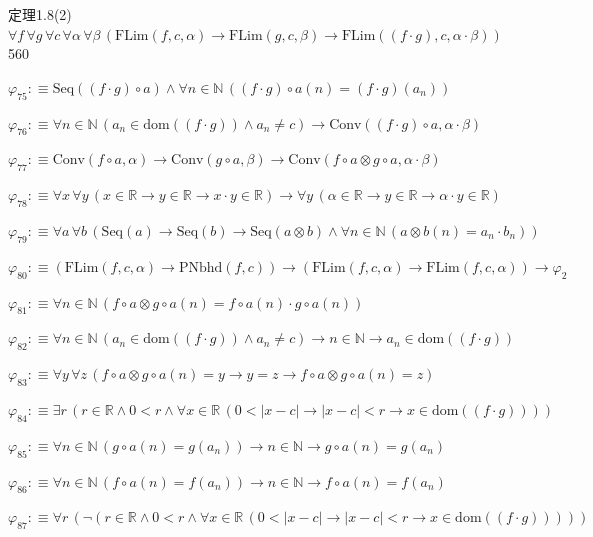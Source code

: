 \begin{fullproof}{定理1.8(2)}{$\forall f\,\forall g\,\forall c\,\forall \alpha\,\forall \beta\,(\mathrm{FLim}(f,c,\alpha) \to \mathrm{FLim}(g,c,\beta) \to \mathrm{FLim}((f \cdot g),c,\alpha \cdot \beta))$}{560}
\begin{abbrevlist}
\item $\varphi_{75} :\equiv \mathrm{Seq}((f \cdot g) \circ a) \land \forall n \in \mathbb{N}\,((f \cdot g) \circ a(n) = (f \cdot g)(a_{n}))$
\item $\varphi_{76} :\equiv \forall n \in \mathbb{N}\,(a_{n} \in \mathrm{dom}((f \cdot g)) \land a_{n} \neq c) \to \mathrm{Conv}((f \cdot g) \circ a,\alpha \cdot \beta)$
\item $\varphi_{77} :\equiv \mathrm{Conv}(f \circ a,\alpha) \to \mathrm{Conv}(g \circ a,\beta) \to \mathrm{Conv}(f \circ a \otimes g \circ a,\alpha \cdot \beta)$
\item $\varphi_{78} :\equiv \forall x\,\forall y\,(x \in \mathbb{R} \to y \in \mathbb{R} \to x \cdot y \in \mathbb{R}) \to \forall y\,(\alpha \in \mathbb{R} \to y \in \mathbb{R} \to \alpha \cdot y \in \mathbb{R})$
\item $\varphi_{79} :\equiv \forall a\,\forall b\,(\mathrm{Seq}(a) \to \mathrm{Seq}(b) \to \mathrm{Seq}(a \otimes b) \land \forall n \in \mathbb{N}\,(a \otimes b(n) = a_{n} \cdot b_{n}))$
\item $\varphi_{80} :\equiv (\mathrm{FLim}(f,c,\alpha) \to \mathrm{PNbhd}(f,c)) \to (\mathrm{FLim}(f,c,\alpha) \to \mathrm{FLim}(f,c,\alpha)) \to \varphi_{2}$
\item $\varphi_{81} :\equiv \forall n \in \mathbb{N}\,(f \circ a \otimes g \circ a(n) = f \circ a(n) \cdot g \circ a(n))$
\item $\varphi_{82} :\equiv \forall n \in \mathbb{N}\,(a_{n} \in \mathrm{dom}((f \cdot g)) \land a_{n} \neq c) \to n \in \mathbb{N} \to a_{n} \in \mathrm{dom}((f \cdot g))$
\item $\varphi_{83} :\equiv \forall y\,\forall z\,(f \circ a \otimes g \circ a(n) = y \to y = z \to f \circ a \otimes g \circ a(n) = z)$
\item $\varphi_{84} :\equiv \exists r\,(r \in \mathbb{R} \land 0 < r \land \forall x \in \mathbb{R}\,(0 < \lvert x - c \rvert \to \lvert x - c \rvert < r \to x \in \mathrm{dom}((f \cdot g))))$
\item $\varphi_{85} :\equiv \forall n \in \mathbb{N}\,(g \circ a(n) = g(a_{n})) \to n \in \mathbb{N} \to g \circ a(n) = g(a_{n})$
\item $\varphi_{86} :\equiv \forall n \in \mathbb{N}\,(f \circ a(n) = f(a_{n})) \to n \in \mathbb{N} \to f \circ a(n) = f(a_{n})$
\item $\varphi_{87} :\equiv \forall r\,(\neg (r \in \mathbb{R} \land 0 < r \land \forall x \in \mathbb{R}\,(0 < \lvert x - c \rvert \to \lvert x - c \rvert < r \to x \in \mathrm{dom}((f \cdot g)))))$

\end{abbrevlist}
\end{fullproof}
